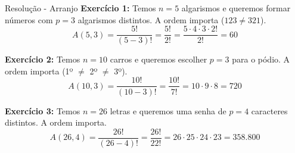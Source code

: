 \documentclass[9pt]{beamer}
\begin{document}
\begin{frame}{Resolução - Arranjo}
\textbf{Exercício 1:}
Temos $n = 5$ algarismos e queremos formar números com $p = 3$ algarismos distintos. A ordem importa ($123 \neq 321$).
\[
A(5,3) = \frac{5!}{(5-3)!} = \frac{5!}{2!} = \frac{5 \cdot 4 \cdot 3 \cdot 2!}{2!} = 60
\]
\vspace{0.2cm}

\textbf{Exercício 2:}
Temos $n = 10$ carros e queremos escolher $p = 3$ para o pódio. A ordem importa (1º $\neq$ 2º $\neq$ 3º).
\[
A(10,3) = \frac{10!}{(10-3)!} = \frac{10!}{7!} = 10 \cdot 9 \cdot 8 = 720
\]
\vspace{0.2cm}

\textbf{Exercício 3:}
Temos $n = 26$ letras e queremos uma senha de $p = 4$ caracteres distintos. A ordem importa.
\[
A(26,4) = \frac{26!}{(26-4)!} = \frac{26!}{22!} = 26 \cdot 25 \cdot 24 \cdot 23 = 358.800
\]
\end{frame}
\end{document}
